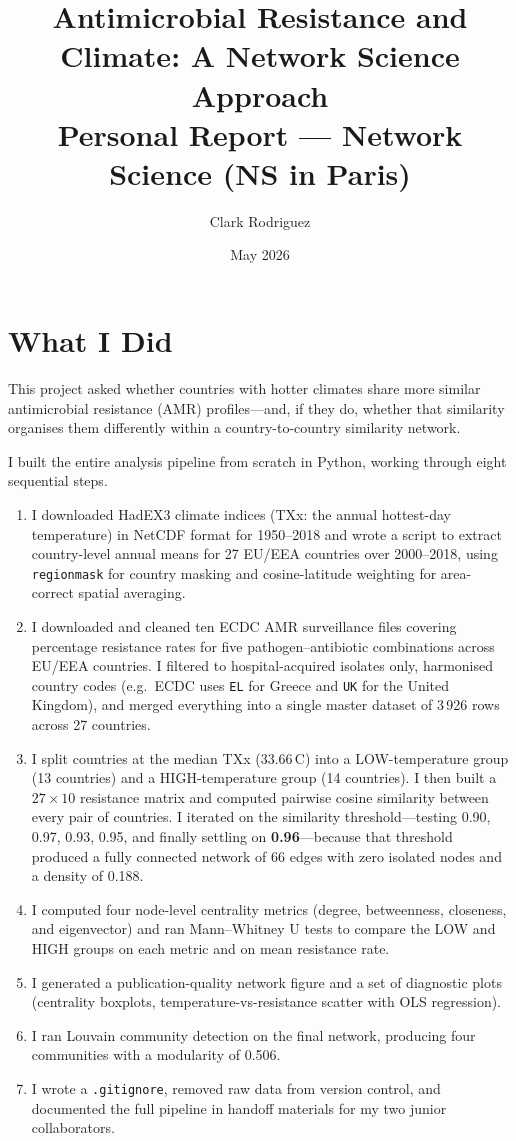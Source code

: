 \documentclass[12pt,a4paper]{article}
\title{\textbf{Antimicrobial Resistance and Climate: A Network Science Approach}\\
\large Personal Report --- Network Science (NS in Paris)}
\author{Clark Rodriguez}
\date{May 2026}
\begin{document}
\maketitle

\section{What I Did}

This project asked whether countries with hotter climates share more
similar antimicrobial resistance (AMR) profiles---and, if they do,
whether that similarity organises them differently within a
country-to-country similarity network.

I built the entire analysis pipeline from scratch in Python, working
through eight sequential steps.
\begin{enumerate}
  \item I downloaded HadEX3 climate indices (TXx: the annual hottest-day
    temperature) in NetCDF format for 1950--2018 and wrote a script to
    extract country-level annual means for 27 EU/EEA countries over 2000--2018,
    using \texttt{regionmask} for country masking and cosine-latitude weighting
    for area-correct spatial averaging.
  \item I downloaded and cleaned ten ECDC AMR surveillance files covering
    percentage resistance rates for five pathogen--antibiotic combinations
    across EU/EEA countries. I filtered to hospital-acquired isolates only,
    harmonised country codes (e.g.\ ECDC uses \texttt{EL} for Greece and
    \texttt{UK} for the United Kingdom), and merged everything into a single
    master dataset of 3\,926 rows across 27 countries.
  \item I split countries at the median TXx (33.66\,\textdegree{}C) into a
    LOW-temperature group (13 countries) and a HIGH-temperature group
    (14 countries). I then built a $27 \times 10$ resistance matrix and
    computed pairwise cosine similarity between every pair of countries.
    I iterated on the similarity threshold---testing 0.90, 0.97, 0.93, 0.95,
    and finally settling on \textbf{0.96}---because that threshold produced a
    fully connected network of 66 edges with zero isolated nodes and a density
    of 0.188.
  \item I computed four node-level centrality metrics (degree, betweenness,
    closeness, and eigenvector) and ran Mann--Whitney U tests to compare the
    LOW and HIGH groups on each metric and on mean resistance rate.
  \item I generated a publication-quality network figure and a set of
    diagnostic plots (centrality boxplots, temperature-vs-resistance scatter
    with OLS regression).
  \item I ran Louvain community detection on the final network, producing four
    communities with a modularity of 0.506.
  \item I wrote a \texttt{.gitignore}, removed raw data from version control,
    and documented the full pipeline in handoff materials for my two junior
    collaborators.
\end{enumerate}
\end{document}
